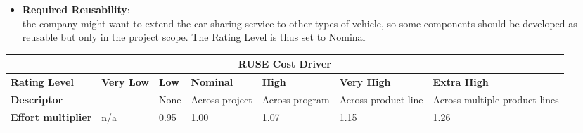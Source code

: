 \begin{itemize}
\item \textbf{Required Reusability}:\\ the company might want to extend the car sharing service to other types of vehicle, so some components should be developed as reusable but only in the project scope. The Rating Level is thus set to Nominal
\end{itemize}
\hspace*{-3cm}\begin{tabular}{|p{3cm}|p{2cm}|p{2cm}|p{2cm}|p{2cm}|p{2cm}|p{2cm}|}
\hline
\multicolumn{7}{|c|}{\textbf{RUSE Cost Driver}}\\
\hline
\hline
\textbf{Rating Level} & \textbf{Very Low} & \textbf{Low} & \textbf{Nominal} & \textbf{High} & \textbf{Very High} & \textbf{Extra High}\\
\hline
\textbf{Descriptor} &  & None & Across project & Across program & Across product line & Across multiple product lines\\
\hline
\textbf{Effort multiplier} & n/a & 0.95 & 1.00 & 1.07 & 1.15 & 1.26\\
\hline 
\end{tabular}